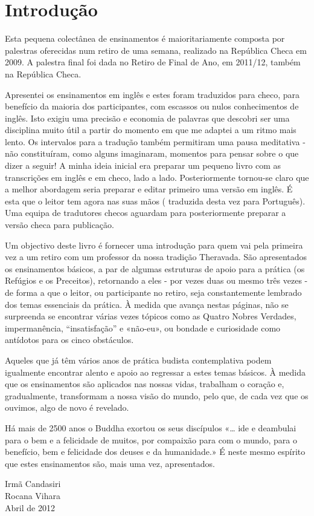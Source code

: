 \chapter{Introdução}

Esta pequena colectânea de ensinamentos é maioritariamente composta por
palestras oferecidas num retiro de uma semana, realizado na República
Checa em 2009. A palestra final foi dada no Retiro de Final de Ano, em
2011/12, também na República Checa.

Apresentei os ensinamentos em inglês e estes foram traduzidos para
checo, para benefício da maioria dos participantes, com escassos ou
nulos conhecimentos de inglês. Isto exigiu uma precisão e economia de
palavras que descobri ser uma disciplina muito útil a partir do momento
em que me adaptei a um ritmo mais lento. Os intervalos para a tradução
também permitiram uma pausa meditativa - não constituíram, como alguns
imaginaram, momentos para pensar sobre o que dizer a seguir! A minha
ideia inicial era preparar um pequeno livro com as transcrições em
inglês e em checo, lado a lado. Posteriormente tornou-se claro que a
melhor abordagem seria preparar e editar primeiro uma versão em inglês.
É esta que o leitor tem agora nas suas mãos ( traduzida desta vez para
Português). Uma equipa de tradutores checos aguardam para posteriormente
preparar a versão checa para publicação.

Um objectivo deste livro é fornecer uma introdução para quem vai pela
primeira vez a um retiro com um professor da nossa tradição Theravada.
São apresentados os ensinamentos básicos, a par de algumas estruturas de
apoio para a prática (os Refúgios e os Preceitos), retornando a eles -
por vezes duas ou mesmo três vezes - de forma a que o leitor, ou
participante no retiro, seja constantemente lembrado dos temas
essenciais da prática. À medida que avança nestas páginas, não se
surpreenda se encontrar várias vezes tópicos como as Quatro Nobres
Verdades, impermanência, ``insatisfação'' e «não-eu», ou bondade e
curiosidade como antídotos para os cinco obstáculos.

Aqueles que já têm vários anos de prática budista contemplativa podem
igualmente encontrar alento e apoio ao regressar a estes temas básicos.
À medida que os ensinamentos são aplicados nas nossas vidas, trabalham o
coração e, gradualmente, transformam a nossa visão do mundo, pelo que,
de cada vez que os ouvimos, algo de novo é revelado.

Há mais de 2500 anos o Buddha exortou os seus discípulos «\ldots{} ide e
deambulai para o bem e a felicidade de muitos, por compaixão para com o
mundo, para o benefício, bem e felicidade dos deuses e da humanidade.» É
neste mesmo espírito que estes ensinamentos são, mais uma vez,
apresentados.

\bigskip

{\raggedleft
Irmã Candasiri\\
Rocana Vihara\\
Abril de 2012
\par}


